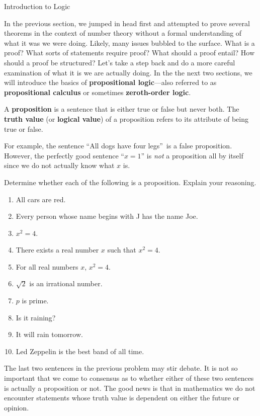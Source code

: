 \begin{section}{Introduction to Logic}\label{sec:Intro to Logic}

In the previous section, we jumped in head first and attempted to prove several theorems in the context of number theory without a formal understanding of what it was we were doing. Likely, many issues bubbled to the surface. What is a proof? What sorts of statements require proof? What should a proof entail?  How should a proof be structured? Let's take a step back and do a more careful examination of what it is we are actually doing. In the the next two sections, we will introduce the basics of \textbf{propositional logic}---also referred to as \textbf{propositional calculus} or sometimes \textbf{zeroth-order logic}.

\begin{definition}
A \textbf{proposition} is a sentence that is either true or false but never both. The \textbf{truth value} (or \textbf{logical value}) of a proposition refers to its attribute of being true or false.
\end{definition}

For example, the sentence ``All dogs have four legs''~is a false proposition.  However, the perfectly good sentence ``$x=1$'' is \emph{not} a proposition all by itself since we do not actually know what $x$ is.

\begin{problem} Determine whether each of the following is a proposition. Explain your reasoning.
\begin{enumerate}[label=\textrm{(\alph*)}]
\item All cars are red.
\item Every person whose name begins with J has the name Joe.
\item $x^2=4$.
\item There exists a real number $x$ such that $x^2=4$.
\item For all real numbers $x$, $x^2=4$.
\item $\sqrt{2}$ is an irrational number.
\item $p$ is prime.
\item Is it raining?
\item It will rain tomorrow.
\item Led Zeppelin is the best band of all time.
\end{enumerate}
\end{problem}

The last two sentences in the previous problem may stir debate. It is not so important that we come to consensus as to whether either of these two sentences is actually a proposition or not. The good news is that in mathematics we do not encounter statements whose truth value is dependent on either the future or opinion.


\end{section}

